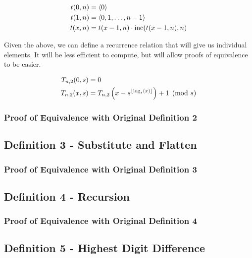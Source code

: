 \documentclass[conference]{IEEEtran}
\begin{document}
\begin{equation}
    \begin{aligned}
        t(0, n) &= \langle 0 \rangle \\
        t(1, n) &= \langle 0, 1, \ldots, n - 1 \rangle \\
        t(x, n) &= t(x - 1, n) \cdot \text{inc}(t(x - 1, n), n)
    \end{aligned}
\end{equation}

Given the above, we can define a recurrence relation that will give us individual elements. It will be less efficient to compute, but will allow proofs of equivalence to be easier.

\begin{equation}
    \begin{aligned}
        T_{n,2}(0, s) &= 0 \\
        T_{n,2}(x, s) &= T_{n,2}\left(x - s^{\left\lfloor \log_s(x) \right\rfloor}\right) + 1 \pmod{s}
    \end{aligned}
\end{equation}

\subsubsection{Proof of Equivalence with Original Definition 2}

\subsection{Definition 3 - Substitute and Flatten}

\subsubsection{Proof of Equivalence with Original Definition 3}

\subsection{Definition 4 - Recursion}

\subsubsection{Proof of Equivalence with Original Definition 4}

\subsection{Definition 5 - Highest Digit Difference}
\end{document}
